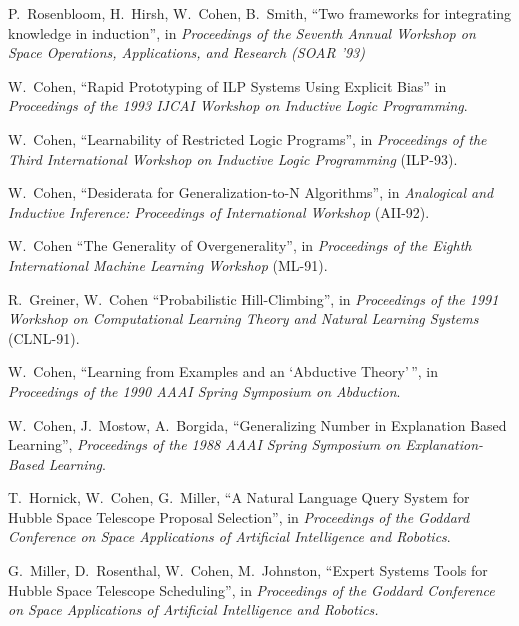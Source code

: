 \item[1993] P.~Rosenbloom, H.~Hirsh, W.~Cohen, B.~Smith, ``Two 
	    	frameworks for integrating knowledge in induction'',
		in {\em Proceedings of the Seventh Annual Workshop on 
		Space Operations, Applications,	and Research (SOAR '93)}

\item[1993] W.~Cohen, ``Rapid Prototyping of ILP Systems Using Explicit 
		Bias'' in {\em Proceedings of the 1993
		IJCAI Workshop on Inductive Logic Programming}.

\item[1993] W.~Cohen, ``Learnability of Restricted Logic Programs'',
		in {\em Proceedings of the Third International
		Workshop on Inductive Logic Programming} (ILP-93).

\item[1992] 	W.~Cohen, ``Desiderata for Generalization-to-N Algorithms'', 
		in {\em Analogical and Inductive Inference: Proceedings
		of International Workshop} (AII-92).

\item[1991]	W.~Cohen ``The Generality of Overgenerality'',
		in {\em Proceedings of the Eighth International 
		Machine Learning Workshop} (ML-91).

\item[1991] 	R.~Greiner, W.~Cohen ``Probabilistic Hill-Climbing'',
		in {\em Proceedings of the 1991 Workshop on Computational
		Learning Theory and Natural Learning Systems} (CLNL-91).

\item[1990]	W.~Cohen, ``Learning from Examples and an `Abductive
		Theory'$\,$'', in {\em Proceedings of the 1990
		AAAI Spring Symposium on Abduction}.

\item[1988]	W.~Cohen, J.~Mostow, A.~Borgida, ``Generalizing Number
		in Explanation Based Learning'', {\em Proceedings of
		the 1988 AAAI Spring Symposium on Explanation-Based 
		Learning}.

\item[1987]	T.~Hornick, W.~Cohen, G.~Miller, ``A Natural Language
		Query System for Hubble Space Telescope Proposal
		Selection'', in {\em Proceedings of the Goddard
		Conference on Space Applications of Artificial
		Intelligence and Robotics}.

\item[1987]	G.~Miller, D.~Rosenthal, W.~Cohen, M.~Johnston,
		``Expert Systems Tools for Hubble Space Telescope
		Scheduling'', in {\em Proceedings of the Goddard
		Conference on Space Applications of Artificial
		Intelligence and Robotics.}

